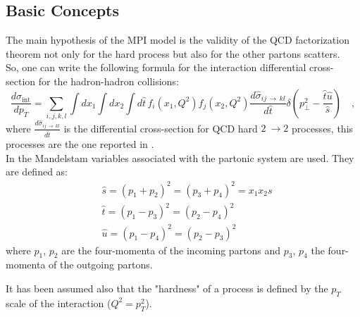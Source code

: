 \subsection{Basic Concepts}
\label{sec:BasicConcepts}

The main hypothesis of the MPI model is the validity of the QCD factorization theorem not only for the hard process but also for the other partons scatters.
\\
So, one can write the following formula for the interaction differential cross-section for the hadron-hadron collisions:
\begin{equation}
	\frac{d\sigma_{\text{int}}}{dp_T}=\displaystyle\sum_{i,j,k,l}\displaystyle\int dx_1 \displaystyle\int dx_2 \displaystyle\int d\hat{t}\, f_i(x_1,Q^2)f_j(x_2,Q^2)\frac{d\hat{\sigma}_{ij\,\rightarrow\,kl}}{d\hat{t}}\delta\left( p_\perp^2-\frac{\hat{t}\hat{u}}{\hat{s}} \right) \quad ,
	\label{eq:sigma_int1}
\end{equation}
where $\frac{d\hat{\sigma}_{ij\,\rightarrow\,kl}}{d\hat{t}}$ is the differential cross-section for QCD hard $2\ \rightarrow 2$ processes, this processes are the one reported in . 
\\
In  the Mandelstam variables associated with the partonic system are used. They are defined as:
\begin{align}
	&\hat{s}=(p_1+p_2)^2=(p_3+p_4)^2=x_1x_2s\\
	&\hat{t}=(p_1-p_3)^2=(p_2-p_4)^2\\
	&\hat{u}=(p_1-p_4)^2=(p_2-p_3)^2
\end{align} 
where $p_1$, $p_2$ are the four-momenta of the incoming partons and $p_3$, $p_4$ the four-momenta of the outgoing partons. 


\noindent It has been assumed also that the "hardness" of a  process is defined by the $p_T$ scale of the interaction ($Q^2=p_T^2$).

